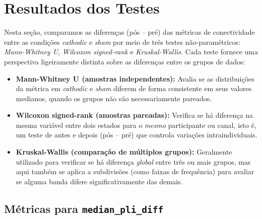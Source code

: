 \section{Resultados dos Testes}

Nesta seção, comparamos as diferenças (pós -- pré) das métricas de conectividade entre as condições \emph{cathodic} e \emph{sham} por meio de três testes não-paramétricos: \emph{Mann-Whitney U}, \emph{Wilcoxon signed-rank} e \emph{Kruskal-Wallis}. Cada teste fornece uma perspectiva ligeiramente distinta sobre as diferenças entre os grupos de dados:

\begin{itemize}
  \item \textbf{Mann-Whitney U (amostras independentes):} Avalia se as distribuições da métrica em \emph{cathodic} e \emph{sham} diferem de forma consistente em seus valores medianos, quando os grupos não são necessariamente pareados.
  \item \textbf{Wilcoxon signed-rank (amostras pareadas):} Verifica se há diferença na mesma variável entre dois estados para o \emph{mesmo} participante ou canal, isto é, um teste de antes e depois (pós -- pré) que controla variações intraindividuais.
  \item \textbf{Kruskal-Wallis (comparação de múltiplos grupos):} Geralmente utilizado para verificar se há diferença \emph{global} entre três ou mais grupos, mas aqui também se aplica a subdivisões (como faixas de frequência) para avaliar se alguma banda difere significativamente das demais.
\end{itemize}

\subsection{\texorpdfstring{Métricas para \texttt{median\_pli\_diff}}{Métricas para median\_pli\_diff}}

